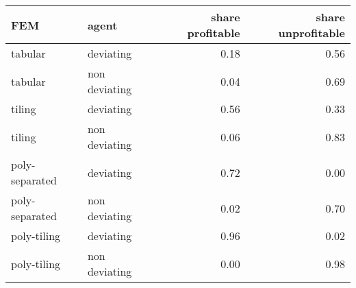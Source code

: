 \begin{tabular}{llrr}
  \hline
FEM & agent & share profitable & share unprofitable \\ 
  \hline
tabular & deviating & 0.18 & 0.56 \\ 
  tabular & non deviating & 0.04 & 0.69 \\ 
  tiling & deviating & 0.56 & 0.33 \\ 
  tiling & non deviating & 0.06 & 0.83 \\ 
  poly-separated & deviating & 0.72 & 0.00 \\ 
  poly-separated & non deviating & 0.02 & 0.70 \\ 
  poly-tiling & deviating & 0.96 & 0.02 \\ 
  poly-tiling & non deviating & 0.00 & 0.98 \\ 
   \hline
\end{tabular}
